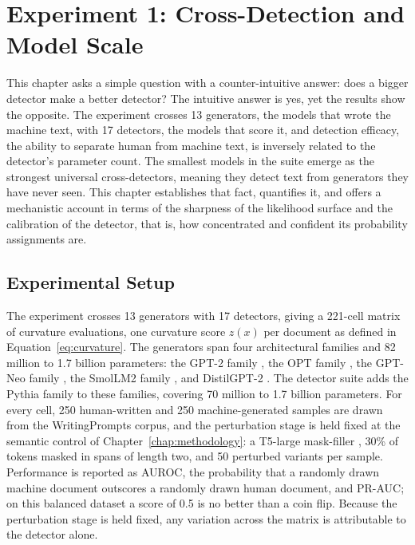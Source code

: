 \documentclass[logo,msc,cs]{infthesis}      %
\begin{document}
\chapter{Experiment 1: Cross-Detection and Model Scale}
\label{chap:exp1}
This chapter asks a simple question with a counter-intuitive answer: does a bigger detector make a better detector? The intuitive answer is yes, yet the results show the opposite. The experiment crosses 13 generators, the models that wrote the machine text, with 17 detectors, the models that score it, and detection efficacy, the ability to separate human from machine text, is inversely related to the detector's parameter count. The smallest models in the suite emerge as the strongest universal cross-detectors, meaning they detect text from generators they have never seen. This chapter establishes that fact, quantifies it, and offers a mechanistic account in terms of the sharpness of the likelihood surface and the calibration of the detector, that is, how concentrated and confident its probability assignments are.

\section{Experimental Setup}
\label{sec:exp1_setup}
The experiment crosses 13 generators with 17 detectors, giving a 221-cell matrix of curvature evaluations, one curvature score $z(x)$ per document as defined in Equation~\ref{eq:curvature}. The generators span four architectural families and 82 million to 1.7 billion parameters: the GPT-2 family \citep{radford2019language}, the OPT family \citep{zhang2022opt}, the GPT-Neo family \citep{black2021gpt}, the SmolLM2 family \citep{allal2024smollm}, and DistilGPT-2 \citep{radford2019language, sanh2019distilbert}. The detector suite adds the Pythia family \citep{biderman2023pythia} to these families, covering 70 million to 1.7 billion parameters.
For every cell, 250 human-written and 250 machine-generated samples are drawn from the WritingPrompts corpus, and the perturbation stage is held fixed at the semantic control of Chapter~\ref{chap:methodology}: a T5-large mask-filler \citep{raffel2020exploring}, 30\% of tokens masked in spans of length two, and 50 perturbed variants per sample. Performance is reported as AUROC, the probability that a randomly drawn machine document outscores a randomly drawn human document, and PR-AUC; on this balanced dataset a score of 0.5 is no better than a coin flip. Because the perturbation stage is held fixed, any variation across the matrix is attributable to the detector alone.
\end{document}
